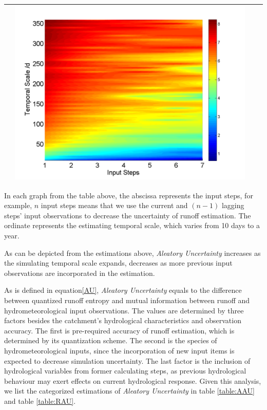 \documentclass[draft,wrr]{AGUTeX}
\begin{document}
\begin{article}
\begin{table}[H]
\begin{tabular}{cccc}
&\begin{minipage}{.3\textwidth}\includegraphics[width=\linewidth]{resultgraph/06810000pepq_abs.png}\end{minipage}
\\
\hline
\end{tabular}
\end{table}

In each graph from the table above, the abscissa represents the input steps, for example, $n$ input steps  means that we use the current and $(n-1)$ lagging steps' input observations to decrease the uncertainty of runoff estimation. The ordinate represents the estimating temporal scale, which varies from 10 days to a year. 

As can be depicted from the estimations above, 
\emph{Aleatory Uncertainty} increases as the simulating temporal scale expands, decreases as more previous input observations are incorporated in  the estimation. %
 
\iffalse
As is defined in equation\ref{AU}, \emph{Aleatory Uncertainty} equals to the difference between quantized runoff entropy and  mutual information between runoff and hydrometeorological input observations. The values are determined by three factors besides the catchment's hydrological characteristics and observation accuracy. The first is pre-required accuracy of runoff estimation, which is determined by its quantization scheme. The second is the species of hydrometeorological inputs, since the incorporation of new input items is expected to decrease simulation uncertainty. The last factor is the inclusion of hydrological variables from former calculating steps, as previous hydrological behaviour may exert effects on current hydrological response. Given this analysis, we list the categorized estimations of \emph{Aleatory Uncertainty} in table  \ref{table:AAU} and table \ref{table:RAU}. 


\end{article}
\end{document}
